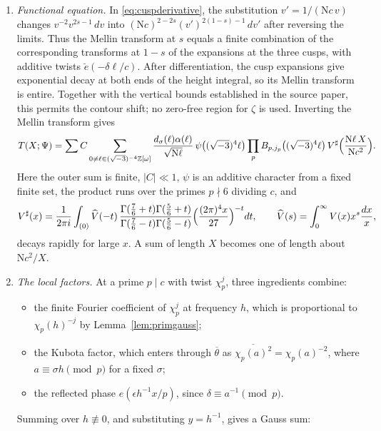 \documentclass[11pt]{article}
\numberwithin{equation}{section}
\newcommand{\N}{\mathrm N}
\newcommand{\OO}{\mathbb Z[\omega]}
\theoremstyle{definition}
\theoremstyle{remark}
\begin{document}
\begin{enumerate}
\item \emph{Functional equation.} In \eqref{eq:cuspderivative}, the substitution $v'=1/(\N c\,v)$ changes
$v^{-2}v^{2s-1}\,dv$ into $(\N c)^{2-2s}(v')^{2(1-s)-1}\,dv'$ after reversing the limits.
Thus the Mellin transform at $s$ equals a finite combination of the corresponding transforms at $1-s$
of the expansions at the three cusps, with additive twists
$\breve e(-\delta\ell/c)$. After differentiation, the cusp expansions give exponential decay at both
ends of the height integral, so its Mellin transform is entire. Together with the vertical bounds
established in the source paper, this permits the contour shift; no zero-free region for $\zeta$ is used.
Inverting the Mellin transform gives \cite[Proposition~6.2]{QRH}
\begin{equation}\label{eq:reflection}
 T(X;\Psi)=\sum C\sum_{0\ne\ell\in(\sqrt{-3})^{-4}\OO}\frac{d_\sigma(\ell)\alpha(\ell)}{\sqrt{\N\ell}}\,
 \psi\bigl((\sqrt{-3})^4\ell\bigr)\prod_{p}B_{p,j_p}\bigl((\sqrt{-3})^4\ell\bigr)\,
 V^\sharp\Bigl(\frac{\N\ell\,X}{\N c^2}\Bigr).
\end{equation}
Here the outer sum is finite, $|C|\ll1$, $\psi$ is an additive character from a fixed finite set, the product
runs over the primes $p\nmid6$ dividing $c$, and
\begin{equation}\label{eq:Vsharp}
 V^\sharp(x)=\frac1{2\pi i}\int_{(0)}\widehat V(-t)\,
 \frac{\Gamma(\frac76+t)\Gamma(\frac56+t)}{\Gamma(\frac76-t)\Gamma(\frac56-t)}
 \Bigl(\frac{(2\pi)^4x}{27}\Bigr)^{-t}dt,\qquad \widehat V(s)=\int_0^\infty V(x)x^{s}\frac{dx}x,
\end{equation}
decays rapidly for large $x$. A sum of length $X$ becomes one of length about $\N c^2/X$.
\item \emph{The local factors.} At a prime $p\mid c$ with twist $\chi_p^j$, three ingredients combine:
\begin{itemize}
\item the finite Fourier coefficient of $\chi_p^j$ at frequency $h$, which is proportional to $\chi_p(h)^{-j}$ by
Lemma~\ref{lem:primgauss};
\item the Kubota factor, which enters through $\overline\theta$ as $\overline{\chi_p(a)^2}=\chi_p(a)^{-2}$, where
$a\equiv\sigma h\pmod p$ for a fixed $\sigma$;
\item the reflected phase $e(\epsilon h^{-1}x/p)$, since $\delta\equiv a^{-1}\pmod p$.
\end{itemize}
Summing over $h\not\equiv0$, and substituting $y=h^{-1}$, gives a Gauss sum:
\begin{equation}\label{eq:localsum}

\end{equation}
\end{enumerate}
\end{document}
